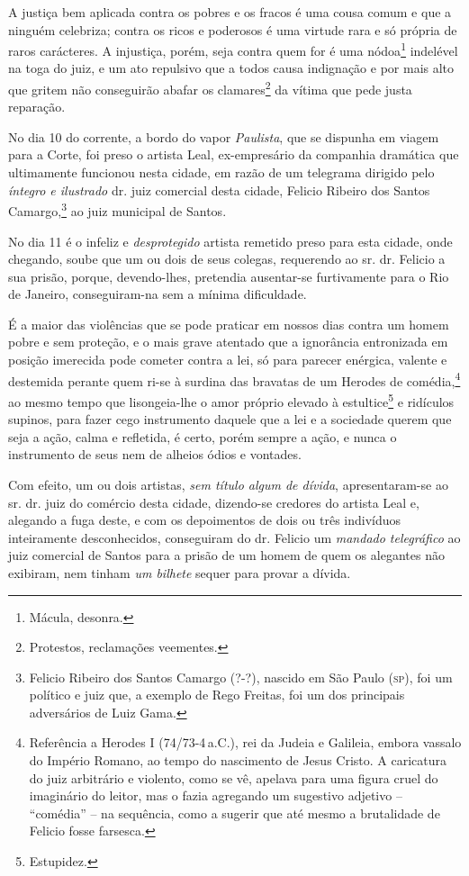 A justiça bem aplicada contra os pobres e os fracos é uma cousa comum e
que a ninguém celebriza; contra os ricos e poderosos é uma virtude rara
e só própria de raros carácteres. A injustiça, porém, seja contra quem
for é uma nódoa\footnote{ Mácula, desonra.} indelével na toga do juiz,
e um ato repulsivo que a todos causa indignação e por mais alto que
gritem não conseguirão abafar os clamares\footnote{ Protestos,
  reclamações veementes.} da vítima que pede justa reparação.

No dia 10 do corrente, a bordo do vapor \emph{Paulista}, que se dispunha
em viagem para a Corte, foi preso o artista Leal, ex-empresário da
companhia dramática que ultimamente funcionou nesta cidade, em razão de
um telegrama dirigido pelo \emph{íntegro e ilustrado} dr. juiz comercial
desta cidade, Felicio Ribeiro dos Santos Camargo,\footnote{ Felicio
  Ribeiro dos Santos Camargo (?-?), nascido em São Paulo (\textsc{sp}), foi um
  político e juiz que, a exemplo de Rego Freitas, foi um dos principais
  adversários de Luiz Gama.} ao juiz municipal de Santos.

No dia 11 é o infeliz e \emph{desprotegido} artista remetido preso para
esta cidade, onde chegando, soube que um ou dois de seus colegas,
requerendo ao sr. dr. Felicio a sua prisão, porque, devendo-lhes,
pretendia ausentar-se furtivamente para o Rio de Janeiro, conseguiram-na
sem a mínima dificuldade.

É a maior das violências que se pode praticar em nossos dias contra um
homem pobre e sem proteção, e o mais grave atentado que a ignorância
entronizada em posição imerecida pode cometer contra a lei, só para
parecer enérgica, valente e destemida perante quem ri-se à surdina das
bravatas de um Herodes de comédia,\footnote{ Referência a Herodes I
  (74/73-4\,a.C.), rei da Judeia e Galileia, embora vassalo do
  Império Romano, ao tempo do nascimento de Jesus Cristo. A caricatura
  do juiz arbitrário e violento, como se vê, apelava para uma figura
  cruel do imaginário do leitor, mas o fazia agregando um sugestivo
  adjetivo -- ``comédia'' -- na sequência, como a sugerir que até mesmo a
  brutalidade de Felicio fosse farsesca.} ao mesmo tempo que
lisongeia-lhe o amor próprio elevado à estultice\footnote{ Estupidez.}
e ridículos supinos, para fazer cego instrumento daquele que a lei e a
sociedade querem que seja a ação, calma e refletida, é certo, porém
sempre a ação, e nunca o instrumento de seus nem de alheios ódios e
vontades.

Com efeito, um ou dois artistas, \emph{sem título algum de dívida},
apresentaram-se ao sr. dr. juiz do comércio desta cidade, dizendo-se
credores do artista Leal e, alegando a fuga deste, e com os depoimentos
de dois ou três indivíduos inteiramente desconhecidos, conseguiram do
dr. Felicio um \emph{mandado telegráfico} ao juiz comercial de Santos
para a prisão de um homem de quem os alegantes não exibiram, nem tinham
\emph{um bilhete} sequer para provar a dívida.

